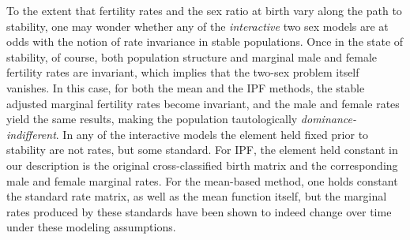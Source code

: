 To the extent that fertility rates and the sex ratio at
birth vary along the path to stability, one may wonder whether any of the
\textit{interactive} two sex models are at odds with the notion of
rate invariance in stable populations. Once in the state of stability, of
course, both population structure and marginal male and female fertility rates are invariant, which
implies that the two-sex problem itself vanishes. In this case, for both the
mean and the IPF methods, the stable adjusted marginal fertility rates become
invariant, and the male and female rates yield the same results, making the
population tautologically \textit{dominance-indifferent}. In any of the
interactive models the element held fixed prior to stability are not rates, but
some standard. For IPF, the element held constant in our 
description is the original cross-classified birth matrix and the corresponding 
male and female marginal rates. For the mean-based method, one holds constant 
the standard rate matrix, as well as the mean function itself, but the marginal 
rates produced by these standards have been shown to indeed change over time
under these modeling assumptions.




